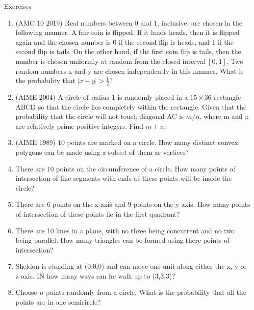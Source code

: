 \begin{xcb}{Exercises}
\begin{enumerate}
\begin{hint}
\end{hint}
\item (AMC 10 2019)  Real numbers between $0$ and $1$, inclusive, are chosen in the following manner. A fair coin is flipped. If it lands heads, then it is flipped again and the chosen number is $0$ if the second flip is heads, and 1 if the second flip is tails. On the other hand, if the first coin flip is tails, then the number is chosen uniformly at random from the closed interval $[0, 1]$. Two random numbers x and y are chosen independently in this manner. What is
the probability that $|x - y| > \frac{1}{2}$?
\begin{hint}
\end{hint}
\item (AIME 2004)  A circle of radius $1$ is randomly placed in a $15 \times 36$ rectangle ABCD so that the circle lies completely within the rectangle. Given that the probability that the circle will not touch diagonal AC is $m/n$, where m and n are relatively prime positive integers. Find $m + n$.
\item (AIME 1989)  $10$ points are marked on a circle. How many distinct convex polygons can be made using a subset of them as vertices?
\item {} There are $10$ points on the circumference of a circle. How many points of intersection of line segments with ends at these points will be inside the circle?
\begin{hint}
\end{hint}
\item {} There are 6 points on the x axis and 9 points on the y axis. How many points of intersection of these points lie in  the first quadrant?
\item {} There are 10 lines in a plane, with no three being concurrent and no two being parallel. How many triangles can be formed using there points of intersection?
\item {} Sheldon is standing at (0,0,0) and can move one unit along either the x, y or z axis. IN how many ways can he walk up to (3,3,3)?
\item {} Choose $n$ points randomly from a circle, What is the probability that all the points are in one semicircle?

\end{enumerate}
\end{xcb}
